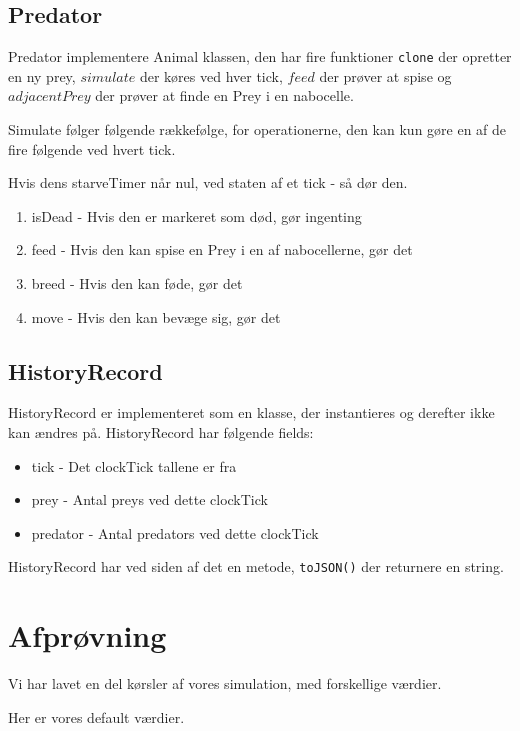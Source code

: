 \documentclass[a4paper]{article}
\begin{document}
    \subsection*{Predator}
      Predator implementere Animal klassen,
      den har fire funktioner \lstinline$clone$ der opretter en ny prey,
      $simulate$ der køres ved hver tick, $feed$ der prøver at spise
      og $adjacentPrey$ der prøver at finde en Prey i en nabocelle.

      Simulate følger følgende rækkefølge, for operationerne,
      den kan kun gøre en af de fire følgende ved hvert tick.

      Hvis dens starveTimer når nul, ved staten af et tick - så dør den.

      \begin{enumerate}
        \item isDead - Hvis den er markeret som død, gør ingenting
        \item feed - Hvis den kan spise en Prey i en af nabocellerne, gør det
        \item breed - Hvis den kan føde, gør det
        \item move - Hvis den kan bevæge sig, gør det
      \end{enumerate}
    
    \subsection*{HistoryRecord}
      HistoryRecord er implementeret som en klasse, der instantieres og derefter ikke kan ændres på.
      HistoryRecord har følgende fields:
      \begin{itemize}
        \item tick - Det clockTick tallene er fra
        \item prey - Antal preys ved dette clockTick
        \item predator - Antal predators ved dette clockTick
      \end{itemize}
      HistoryRecord har ved siden af det en metode, \lstinline$toJSON()$ der returnere en string.
      
  \section{Afprøvning} \label{sec:unitTest}

    Vi har lavet en del kørsler af vores simulation,
    med forskellige værdier.

    Her er vores default værdier.
\end{document}
